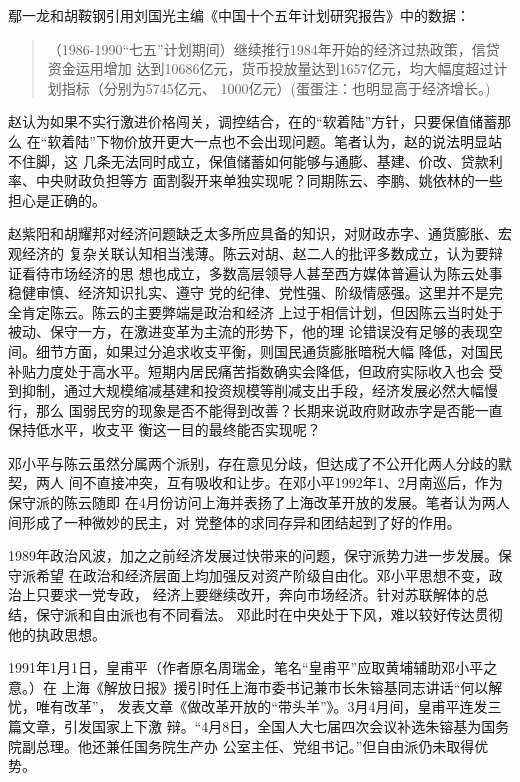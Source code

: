 鄢一龙和胡鞍钢引用刘国光主编《中国十个五年计划研究报告》中的数据：
\begin{quotation}
（1986-1990“七五”计划期间）继续推行1984年开始的经济过热政策，信贷资金运用增加
达到10686亿元，货币投放量达到1657亿元，均大幅度超过计划指标（分别为5745亿元、
1000亿元）(蛋蛋注：也明显高于经济增长。)\cite{shiyiwu}
\end{quotation}

赵认为如果不实行激进价格闯关，调控结合，在的“软着陆”方针，只要保值储蓄那么
在“软着陆”下物价放开更大一点也不会出现问题。笔者认为，赵的说法明显站不住脚，这
几条无法同时成立，保值储蓄如何能够与通膨、基建、价改、贷款利率、中央财政负担等方
面割裂开来单独实现呢？同期陈云、李鹏、姚依林的一些担心是正确的。

赵紫阳和胡耀邦对经济问题缺乏太多所应具备的知识，对财政赤字、通货膨胀、宏观经济的
复杂关联认知相当浅薄。陈云对胡、赵二人的批评多数成立，认为要辩证看待市场经济的思
想也成立，多数高层领导人甚至西方媒体普遍认为陈云处事稳健审慎、经济知识扎实、遵守
党的纪律、党性强、阶级情感强。这里并不是完全肯定陈云。陈云的主要弊端是政治和经济
上过于相信计划，但因陈云当时处于被动、保守一方，在激进变革为主流的形势下，他的理
论错误没有足够的表现空间。细节方面，如果过分追求收支平衡，则国民通货膨胀暗税大幅
降低，对国民补贴力度处于高水平。短期内居民痛苦指数确实会降低，但政府实际收入也会
受到抑制，通过大规模缩减基建和投资规模等削减支出手段，经济发展必然大幅慢行，那么
国弱民穷的现象是否不能得到改善？长期来说政府财政赤字是否能一直保持低水平，收支平
衡这一目的最终能否实现呢？

邓小平与陈云虽然分属两个派别，存在意见分歧，但达成了不公开化两人分歧的默契，两人
间不直接冲突，互有吸收和让步。在邓小平1992年1、2月南巡后，作为保守派的陈云随即
在4月份访问上海并表扬了上海改革开放的发展。笔者认为两人间形成了一种微妙的民主，对
党整体的求同存异和团结起到了好的作用。

1989年政治风波，加之之前经济发展过快带来的问题，保守派势力进一步发展。保守派希望
在政治和经济层面上均加强反对资产阶级自由化。邓小平思想不变，政治上只要求一党专政，
经济上要继续改开，奔向市场经济。针对苏联解体的总结，保守派和自由派也有不同看法。
邓此时在中央处于下风，难以较好传达贯彻他的执政思想。

1991年1月1日，皇甫平（作者原名周瑞金，笔名“皇甫平”应取黄埔辅助邓小平之意。）在
上海《解放日报》援引时任上海市委书记兼市长朱镕基同志讲话“何以解忧，唯有改革”，
发表文章《做改革开放的“带头羊”》。3月4月间，皇甫平连发三篇文章，引发国家上下激
辩。“4月8日，全国人大七届四次会议补选朱镕基为国务院副总理。他还兼任国务院生产办
公室主任、党组书记。”但自由派仍未取得优势。

